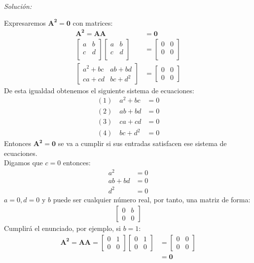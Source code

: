 \documentclass[12pt]{article}
\newenvironment{sol}
    {\emph{Solución:}
    }
    {
    }
\begin{document}
\begin{sol}
Expresaremos $\mathbf{A^2}=\mathbf{0}$ con matrices:
\begin{align*}
\mathbf{A^2}=\mathbf{AA} &= \mathbf{0} \\
\begin{bmatrix}
a & b \\
c & d \\
\end{bmatrix}
\begin{bmatrix}
a & b \\
c & d \\
\end{bmatrix}
&=
\begin{bmatrix}
0 & 0 \\
0 & 0 \\
\end{bmatrix}\\
\begin{bmatrix}
a^2+bc & ab+bd \\
ca+cd & bc + d^2
\end{bmatrix}
&= 
\begin{bmatrix}
0 & 0 \\
0 & 0
\end{bmatrix}
\end{align*}
De esta igualdad obtenemos el siguiente sistema de ecuaciones:
\begin{align*}
(1) \quad a^2+bc &=0 \\
(2) \quad ab+bd &= 0\\
(3) \quad ca+cd &= 0\\
(4) \quad bc + d^2 &= 0
\end{align*}
Entonces $\mathbf{A^2}=\mathbf{0}$ se va a cumplir si sus entradas satisfacen ese sistema de ecuaciones.\\
Digamos que $c=0$ entonces:
\begin{align*}
a^2 &=0 \\
ab+bd &= 0\\
d^2 &= 0
\end{align*}
$a=0 , d=0 $ y $b$ puede ser cualquier número real, por tanto, una matriz de forma:
\begin{align*}
\begin{bmatrix}
0 & b \\
0 & 0
\end{bmatrix}
\end{align*}
Cumplirá el enunciado, por ejemplo, si $b=1$:
\begin{align*}
\mathbf{A^2}=\mathbf{AA}=
\begin{bmatrix}
0 & 1 \\
0 & 0
\end{bmatrix}
\begin{bmatrix}
0 & 1 \\
0 & 0
\end{bmatrix}
&=\begin{bmatrix}
0 & 0 \\
0 & 0
\end{bmatrix}
\\
&= \mathbf{0}
\end{align*}

\end{sol}

\pagebreak





\end{document}
